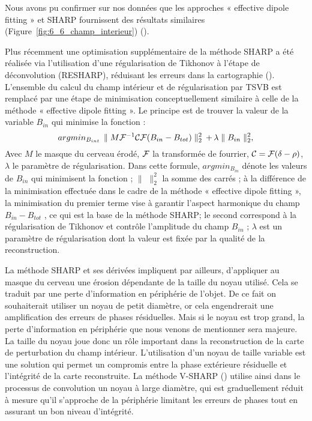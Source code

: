 {Nous avons pu confirmer sur nos données que les approches « effective dipole fitting » et
SHARP fournissent des résultats similaires (Figure~\ref{fig:6_6_champ_interieur}) (\cite{Schweser2011}).

Plus récemment une optimisation supplémentaire de la méthode SHARP a été réalisée via
l’utilisation d’une régularisation de Tikhonov à l’étape de déconvolution (RESHARP), réduisant les
erreurs dans la cartographie (\cite{Sun2014}). L’ensemble du calcul du champ intérieur et de régularisation par
TSVB est remplacé par une étape de minimisation conceptuellement similaire à celle de la méthode
« effective dipole fitting ». Le principe est de trouver la valeur de la variable $B_{in}$ qui minimise la
fonction :
\begin{equation}
argmin_{B_{int}}\,\parallel M{\cal F}^{-1}{\cal C}{\cal F}(B_{in}-B_{tot})\parallel_2^2\,+\,\lambda\parallel B_{in}\parallel_2^2,
\end{equation}
Avec $M$ le masque du cerveau érodé, ${\cal F}$ la transformée de fourrier, ${\cal C} = {\cal F}(\delta-\rho)$, $\lambda$ le paramètre de
régularisation. Dans cette formule, $argmin_{B_{in}}$ dénote les valeurs de $B_{in}$ qui minimisent la fonction ; $\parallel\,\,\parallel_2^2$ la somme des carrés ; à la différence de la minimisation effectuée dans le cadre de la méthode « effective dipole fitting », la minimisation du premier terme vise à garantir l’aspect harmonique du
champ $B_{in}-B_{tot}$ , ce qui est la base de la méthode SHARP; le second correspond à la régularisation
de Tikhonov et contrôle l’amplitude du champ $B_{in}$ ; $\lambda$ est un paramètre de régularisation dont la valeur
est fixée par la qualité de la reconstruction.

La méthode SHARP et ses dérivées impliquent par ailleurs, d’appliquer au masque du cerveau
une érosion dépendante de la taille du noyau utilisé. Cela se traduit par une perte d’information en
périphérie de l’objet. De ce fait on souhaiterait utiliser un noyau de petit diamètre, or cela engendrerait
une amplification des erreurs de phases résiduelles. Mais si le noyau est trop grand, la perte
d’information en périphérie que nous venons de mentionner sera majeure. La taille du noyau joue
donc un rôle important dans la reconstruction de la carte de perturbation du champ intérieur.
L’utilisation d’un noyau de taille variable est une solution qui permet un compromis entre la phase
extérieure résiduelle et l’intégrité de la carte reconstruite. La méthode V-SHARP (\cite{Wu2012}) utilise ainsi dans
le processus de convolution un noyau à large diamètre, qui est graduellement réduit à mesure qu’il
s’approche de la périphérie limitant les erreurs de phases tout en assurant un bon niveau d’intégrité.
}
